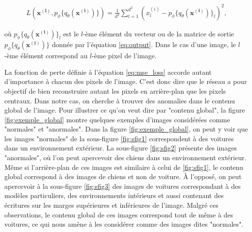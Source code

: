\begin{gather} \label{eq:mse_loss}
L(\boldsymbol{x^{(i)}}, p_\phi\{q_\theta(\boldsymbol{x^{(i)}})\}) = \frac{1}{d^2} \sum_{l=1}^{d^2} (x^{(i)}_{l} - p_\phi\{q_\theta(\boldsymbol{x^{(i)}})\}_l)^2,
\end{gather}

où $p_\phi\{q_\theta(\boldsymbol{x^{(i)}})\}_l$ est le $l$-ème élément du vecteur ou de la matrice de sortie $p_\phi\{q_\theta(\boldsymbol{x^{(i)}})\}$ donnée par l'équation \ref{eq:output}. Dans le cas d'une image, le $l$-ème élément correspond au $l$-ème  pixel de l'image.

La fonction de perte définie à l'équation \ref{eq:mse_loss} accorde autant d'importance à chacun des pixels de l'image. C'est donc dire que le réseau a pour objectif de bien reconstruire autant les pixels en arrière-plan que les pixels centraux. Dans notre cas,  on cherche à trouver des anomalies dans le contenu global de l'image. Pour illustrer ce qu'on veut dire par "contenu global", la figure \ref{fig:exemple_global} montre quelques exemples d'images considérées comme "normales" et "anormales". Dans la figure \ref{fig:exemple_global}, on peut y voir que les images "normales" de la sous-figure \ref{fig:sfig1} correspondent à des voitures dans un environnement extérieur. La sous-figure \ref{fig:sfig2} présente des images "anormales", où l'on peut apercevoir des chiens dans un environnement extérieur. Même si l'arrière-plan de ces images est similaire à celui de \ref{fig:sfig1}, le contenu global correspond à des images de chiens et non de voiture. À l'opposé, on peut apercevoir à la sous-figure \ref{fig:sfig3} des images de voitures correspondant à des modèles particuliers, des environnements intérieurs et aussi contenant des écritures sur les marges supérieures et inférieures de l'image. Malgré ces observations, le contenu global de ces images correspond tout de même à des voitures, ce qui nous amène à les considérer comme des images dites "normales".

